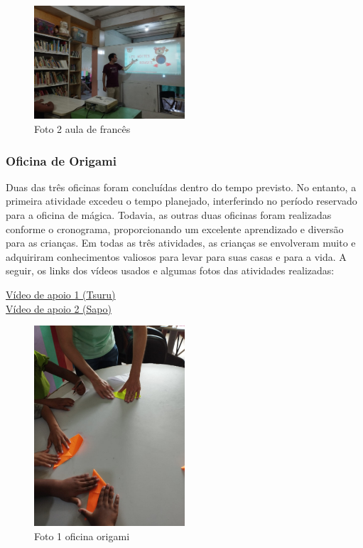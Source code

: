 \documentclass[a4paper,12pt]{article}
\begin{document}
\begin{figure}[h]
    \centering
    \includegraphics[width=0.5\textwidth]{imagem5.png}
    \caption{Foto 2 aula de francês}
    \label{fig:foto1505}
\end{figure}

\newpage

\subsubsection{Oficina de Origami}
Duas das três oficinas foram concluídas dentro do tempo previsto. No entanto, a primeira atividade excedeu o tempo planejado, interferindo no período reservado para a oficina de mágica. Todavia, as outras duas oficinas foram realizadas conforme o cronograma, proporcionando um excelente aprendizado e diversão para as crianças. Em todas as três atividades, as crianças se envolveram muito e adquiriram conhecimentos valiosos para levar para suas casas e para a vida. A seguir, os links dos vídeos usados e algumas fotos das atividades realizadas:

\vspace{1cm}

\href{https://youtu.be/pzS0ToWZ9DA?si=ObnPbtDY5x3C888C}{Vídeo de apoio 1 (Tsuru)}\\

\href{https://youtu.be/wMP6qhHYKFE?si=oCtZ1KJRkNBfFcck}{Vídeo de apoio 2 (Sapo)}\\

\begin{figure}[h]
    \centering
    \includegraphics[width=0.5\textwidth]{imagem 6.png}
    \caption{Foto 1 oficina origami}
    \label{fig:foto1505}
\end{figure}
\end{document}
